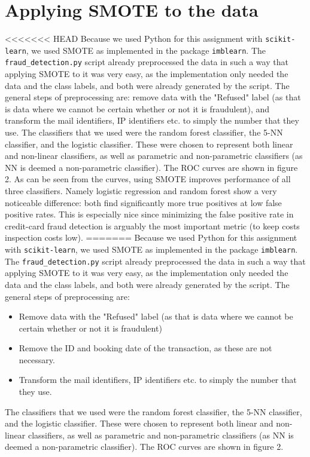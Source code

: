 \documentclass[]{article}
\begin{document}
\section{Applying SMOTE to the data}
<<<<<<< HEAD
Because we used Python for this assignment with \texttt{scikit-learn}, we used SMOTE as implemented in the package \texttt{imblearn}. The \texttt{fraud\_detection.py} script already preprocessed the data in such a way that applying SMOTE to it was very easy, as the implementation only needed the data and the class labels, and both were already generated by the script. The general steps of preprocessing are: remove data with the "Refused" label (as that is data where we cannot be certain whether or not it is fraudulent), and transform the mail identifiers, IP identifiers etc. to simply the number that they use. The classifiers that we used were the random forest classifier, the 5-NN classifier, and the logistic classifier. These were chosen to represent both linear and non-linear classifiers, as well as parametric and non-parametric classifiers (as NN is deemed a non-parametric classifier). The ROC curves are shown in figure 2. As can be seen from the curves, using SMOTE improves performance of all three classifiers. Namely logistic regression and random forest show a very noticeable difference: both find significantly more true positives at low false positive rates. This is especially nice since minimizing the false positive rate in credit-card fraud detection is arguably the most important metric (to keep costs inspection costs low).   
=======
Because we used Python for this assignment with \texttt{scikit-learn}, we used SMOTE as implemented in the package \texttt{imblearn}. The \texttt{fraud\_detection.py} script already preprocessed the data in such a way that applying SMOTE to it was very easy, as the implementation only needed the data and the class labels, and both were already generated by the script. The general steps of preprocessing are: 
\begin{itemize}
	\item Remove data with the "Refused" label (as that is data where we cannot be certain whether or not it is fraudulent)
	\item Remove the ID and booking date of the transaction, as these are not necessary.
	\item Transform the mail identifiers, IP identifiers etc. to simply the number that they use.
\end{itemize}
The classifiers that we used were the random forest classifier, the 5-NN classifier, and the logistic classifier. These were chosen to represent both linear and non-linear classifiers, as well as parametric and non-parametric classifiers (as NN is deemed a non-parametric classifier). The ROC curves are shown in figure 2.
\end{document}
